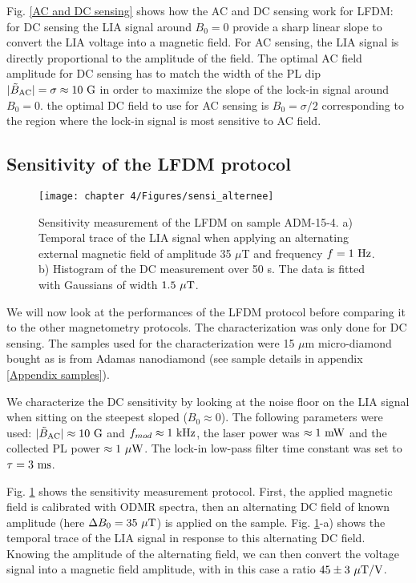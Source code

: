 \documentclass[a4paper, 11pt]{report}
\begin{document}
Fig. \ref{AC and DC sensing} shows how the AC and DC sensing work for LFDM: for DC sensing the LIA signal around $B_0=0$ provide a sharp linear slope to convert the LIA voltage into a magnetic field. For AC sensing, the LIA signal is directly proportional to the amplitude of the field. The optimal AC field amplitude for DC sensing has to match the width of the PL dip $|\tilde{B}_{\rm AC}| = \sigma \approx 10\ \rm G$ in order to maximize the slope of the lock-in signal around $B_0=0$. the optimal DC field to use for AC sensing is $B_0= \sigma/2$ corresponding to the region where the lock-in signal is most sensitive to AC field. 

\subsection{Sensitivity of the LFDM protocol}
\begin{figure}[h!]
\centering
\texttt{[image: chapter 4/Figures/sensi\_alternee]}
\caption{Sensitivity measurement of the LFDM on sample ADM-15-4. a) Temporal trace of the LIA signal when applying an alternating external magnetic field of amplitude 35 $\mu$T and frequency $f=1\ \rm Hz$. b) Histogram of the DC measurement over 50 s. The data is fitted with Gaussians of width $1.5\ \rm{\mu T}$.}
\label{sensei alternee}
\end{figure}

We will now look at the performances of the LFDM protocol before comparing it to the other magnetometry protocols. The characterization was only done for DC sensing. The samples used for the characterization were 15 $\mu$m micro-diamond bought as is from Adamas nanodiamond (see sample details in appendix \ref{Appendix samples}).

We characterize the DC sensitivity by looking at the noise floor on the LIA signal when sitting on the steepest sloped ($B_0\approx 0$). The following parameters were used: $|\tilde{B}_{\rm AC}|\approx 10\ \rm G$ and $f_{mod} \approx 1\ \rm kHz$, the laser power was $\approx 1\ \rm mW$ and the collected PL power $\approx 1\ \rm{\mu W}$. The lock-in low-pass filter time constant was set to $\tau=3\ \rm ms$.

Fig. \ref{sensei alternee} shows the sensitivity measurement protocol. First, the applied magnetic field is calibrated with ODMR spectra, then an alternating DC field of known amplitude (here $\Delta B_0=35\ \rm{\mu T}$) is applied on the sample. Fig. \ref{sensei alternee}-a) shows the temporal trace of the LIA signal in response to this alternating DC field. Knowing the amplitude of the alternating field, we can then convert the voltage signal into a magnetic field amplitude, with in this case a ratio $45 \pm 3\ \rm{\mu T /V}$.
\end{document}
